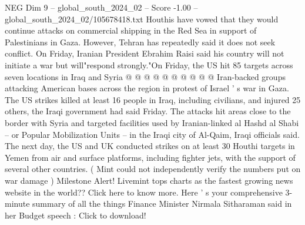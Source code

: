 \begin{textsample}{NEG Dim 9 – global\_south\_2024\_02 – Score -1.00 – global\_south\_2024\_02/105678418.txt}
Houthis have vowed that they would continue attacks on commercial shipping in the Red Sea in support of Palestinians in Gaza.
However, Tehran has repeatedly said it does not seek conflict.
On Friday, Iranian President Ebrahim Raisi said his country will not initiate a war but will"respond strongly."On Friday, the US hit 85 targets across seven locations in Iraq and Syria @ @ @ @ @ @ @ @ @ @ Iran-backed groups attacking American bases across the region in protest of Israel ' s war in Gaza.
The US strikes killed at least 16 people in Iraq, including civilians, and injured 25 others, the Iraqi government had said Friday.
The attacks hit areas close to the border with Syria and targeted facilities used by Iranian-linked al Hashd al Shabi -- or Popular Mobilization Units -- in the Iraqi city of Al-Qaim, Iraqi officials said.
The next day, the US and UK conducted strikes on at least 30 Houthi targets in Yemen from air and surface platforms, including fighter jets, with the support of several other countries. ( Mint could not independently verify the numbers put on war damage ) Milestone Alert!
Livemint tops charts as the fastest growing news website in the world??
Click here to know more.
Here ' s your comprehensive 3-minute summary of all the things Finance Minister Nirmala Sitharaman said in her Budget speech : Click to download!

\end{textsample}
